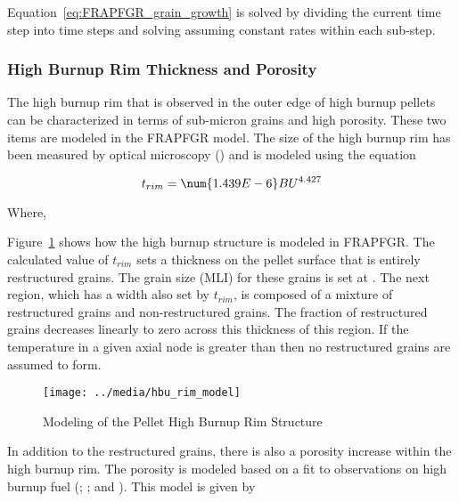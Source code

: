 Equation~\ref{eq:FRAPFGR_grain_growth} is solved by dividing the current time step into 
time steps and solving assuming constant rates within each sub-step.

\subsubsection{High Burnup Rim Thickness and Porosity}\label{high-burnup-rim-thickness-and-porosity}

The high burnup rim that is observed in the outer edge of high burnup pellets can be characterized
in terms of sub-micron grains and high porosity. These two items are modeled in the FRAPFGR model.
The size of the high burnup rim has been measured by optical microscopy (\cite{ref:Manzel2002}) and
is modeled using the equation

\begin{equation}
    \label{eq:high_burnup_rim_thickness}
    t_{rim} = \num{1.439E-6}BU^{4.427}
\end{equation}

Where,

Figure~\ref{fig:hbu_rim_model} shows how the high burnup structure is modeled in FRAPFGR.  The
calculated value of \(t_{rim}\) sets a thickness on the pellet surface that is entirely restructured
grains. The grain size (MLI) for these grains is set at . The next region, which has a
width also set by \(t_{rim}\), is composed of a mixture of restructured grains and non-restructured
grains. The fraction of restructured grains decreases linearly to zero across this thickness of this
region. If the temperature in a given axial node is greater than  then no
restructured grains are assumed to form.

\begin{figure}
    \texttt{[image: ../media/hbu\_rim\_model]}
    \caption{Modeling of the Pellet High Burnup Rim Structure}
    \label{fig:hbu_rim_model}
\end{figure}

In addition to the restructured grains, there is also a porosity increase within the high burnup
rim. The porosity is modeled based on a fit to observations on high burnup fuel
(\cite{ref:Spino1996}; \cite{ref:Une2001}; and \cite{ref:Manzel2000}). This model is given by

